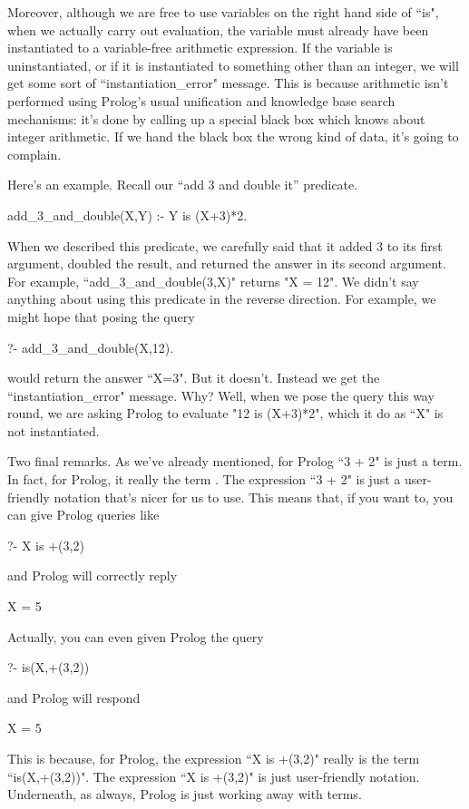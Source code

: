 Moreover, although we are free to use variables on the right hand side
of ``is", when we actually carry out evaluation, the variable must
already have been instantiated to a variable-free arithmetic
expression.  If the variable is uninstantiated, or if it is
instantiated to something other than an integer, we will get some sort
of ``instantiation\_error" message.  This is because arithmetic isn't
performed using Prolog's usual unification and knowledge base search
mechanisms: it's done by calling up a special black box which knows
about integer arithmetic.  If we hand the black box the wrong kind of
data, it's going to complain.

Here's an example. Recall our ``add 3 and double it''
predicate.
\begin{LPNcodedisplay}
add_3_and_double(X,Y) :- Y is (X+3)*2.
\end{LPNcodedisplay}
When we described this predicate, we carefully said that it added 3 to
its first argument, doubled the result, and returned the answer in its
second argument.  For example, ``add\_3\_and\_double(3,X)" returns
"X = 12".  We didn't say anything about using this predicate in
the reverse direction.  For example, we might hope that posing the
query
\begin{LPNcodedisplay}
?- add_3_and_double(X,12).
\end{LPNcodedisplay}
would return the answer ``X=3".   But it doesn't. Instead we
get the ``instantiation\_error" message.  Why?  Well, when we pose
the query this way round, we are asking Prolog to evaluate
"12 is (X+3)*2", which it  do as ``X"
is not instantiated.

Two final remarks.  As we've already mentioned, for Prolog ``3 + 2"
is just a term.  In fact, for Prolog, it really  the term
.  The expression ``3 + 2" is just a user-friendly
notation that's nicer for us to use.  This means that, if you
want to, you can give Prolog queries like
\begin{LPNcodedisplay}
?- X is +(3,2)
\end{LPNcodedisplay}
and Prolog will correctly reply
\begin{LPNcodedisplay}
X = 5
\end{LPNcodedisplay}
Actually, you can even given Prolog the query
\begin{LPNcodedisplay}
?- is(X,+(3,2))
\end{LPNcodedisplay}
and Prolog will respond
\begin{LPNcodedisplay}
X = 5
\end{LPNcodedisplay}
This is because, for Prolog, the expression ``X is +(3,2)" really is
the term ``is(X,+(3,2))".  The expression ``X is +(3,2)" is just
user-friendly notation.  Underneath, as always, Prolog is just working
away with terms.

